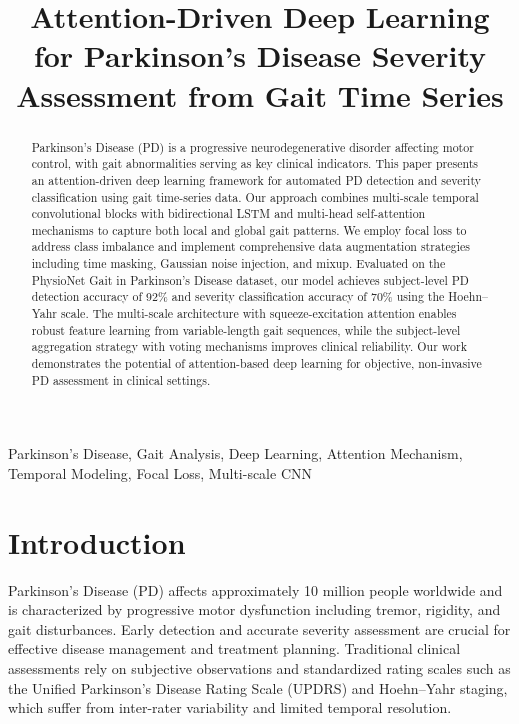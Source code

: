 \documentclass[conference]{IEEEtran}
\begin{document}
\title{Attention-Driven Deep Learning for Parkinson's Disease Severity Assessment from Gait Time Series}

\author{
}

\maketitle

\begin{abstract}
Parkinson's Disease (PD) is a progressive neurodegenerative disorder affecting motor control, with gait abnormalities serving as key clinical indicators. This paper presents an attention-driven deep learning framework for automated PD detection and severity classification using gait time-series data. Our approach combines multi-scale temporal convolutional blocks with bidirectional LSTM and multi-head self-attention mechanisms to capture both local and global gait patterns. We employ focal loss to address class imbalance and implement comprehensive data augmentation strategies including time masking, Gaussian noise injection, and mixup. Evaluated on the PhysioNet Gait in Parkinson's Disease dataset, our model achieves subject-level PD detection accuracy of 92\% and severity classification accuracy of 70\% using the Hoehn--Yahr scale. The multi-scale architecture with squeeze-excitation attention enables robust feature learning from variable-length gait sequences, while the subject-level aggregation strategy with voting mechanisms improves clinical reliability. Our work demonstrates the potential of attention-based deep learning for objective, non-invasive PD assessment in clinical settings.
\end{abstract}

\begin{IEEEkeywords}
Parkinson's Disease, Gait Analysis, Deep Learning, Attention Mechanism, Temporal Modeling, Focal Loss, Multi-scale CNN
\end{IEEEkeywords}

\section{Introduction}
Parkinson's Disease (PD) affects approximately 10 million people worldwide and is characterized by progressive motor dysfunction including tremor, rigidity, and gait disturbances. Early detection and accurate severity assessment are crucial for effective disease management and treatment planning. Traditional clinical assessments rely on subjective observations and standardized rating scales such as the Unified Parkinson's Disease Rating Scale (UPDRS) and Hoehn--Yahr staging, which suffer from inter-rater variability and limited temporal resolution.
\end{document}
